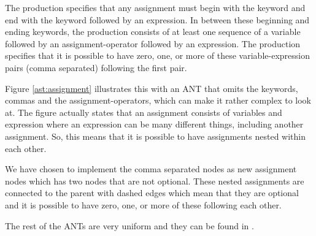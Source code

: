 The production specifies that any assignment must begin with the keyword
 and end with the keyword  followed by an expression. In
between these beginning and ending keywords, the production consists of at least
one sequence of a variable followed by an assignment-operator followed by an
expression. The production specifies that it is possible to have zero, one, or
more of these variable-expression pairs (comma separated) following the first
pair.



Figure \ref{ast:assignment} illustrates this with an ANT that omits the
keywords, commas and the assignment-operators, which can make it rather complex
to look at. The figure actually states that an assignment consists of variables
and expression where an expression can be many different things, including
another assignment. So, this means that it is possible to have assignments
nested within each other. 

We have chosen to implement the comma separated nodes as new assignment nodes
which has two nodes that are not optional. These nested assignments are
connected to the parent with dashed edges which mean that they are optional and
it is possible to have zero, one, or more of these following each other.

The rest of the ANTs are very uniform and they can be found in .
